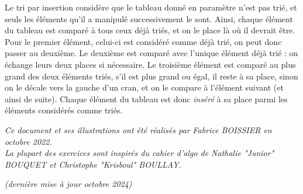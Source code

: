 \documentclass[11pt,a4paper]{article}
\begin{document}
Le tri par insertion considère que le tableau donné en paramètre n'est pas trié, et seuls les éléments qu'il a manipulé successivement le sont.
Ainsi, chaque élément du tableau est comparé à tous ceux déjà triés, et on le place là où il devrait être.
Pour le premier élément, celui-ci est considéré comme déjà trié, on peut donc passer au deuxième.
Le deuxième est comparé avec l'unique élément déjà trié : on échange leurs deux places si nécessaire.
Le troisième élément est comparé au plus grand des deux éléments triés, s'il est plus grand ou égal, il reste à sa place, sinon on le décale vers la gauche d'un cran, et on le compare à l'élément suivant (et ainsi de suite).
Chaque élément du tableau est donc \textit{inséré} à sa place parmi les éléments considérés comme triés.

\bigskip



\vfillFirst

\vfillLast


\begin{center}
\textit{Ce document et ses illustrations ont été réalisés par Fabrice BOISSIER en octobre 2022.\\
La plupart des exercices sont inspirés du cahier d'algo de Nathalie "Junior" BOUQUET et Christophe "Krisboul" BOULLAY.}

\textit{(dernière mise à jour octobre 2024)}
\end{center}
\end{document}
